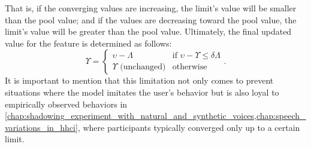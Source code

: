 \noindent
%
That is, if the converging values are increasing, the limit's value will be smaller than the pool value;
and if the values are decreasing toward the pool value, the limit's value will be greater than the pool value.
Ultimately, the final updated value for the feature is determined as follows:
%
\begin{equation}
	\label{eq:new_value}
	\Upsilon = 		
	\begin{cases}
		\upsilon - \Lambda & \text{if }\upsilon - \Upsilon \leq \delta\Lambda\\
		\Upsilon \text{ (unchanged)} & \text{otherwise}
	\end{cases}.
\end{equation}
\noindent
%
It is important to mention that this limitation not only comes to prevent situations where the model imitates the user's behavior but is also loyal to empirically observed behaviors in \cref{chap:shadowing_experiment_with_natural_and_synthetic_voices,chap:speech_variations_in_hhci}, where participants typically converged only up to a certain limit.

